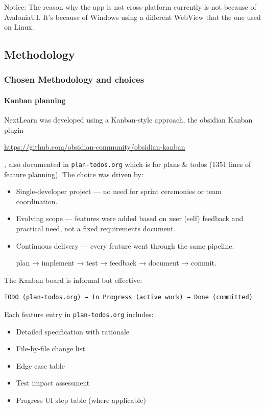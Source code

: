 \documentclass[14pt]{article}
\begin{document}
Notice: The reason why the app is not cross-platform currently is not because of AvaloniaUI. It's because of Windows using a different WebView that the one used on Linux.
\subsection{Methodology}
\label{sec:org0ae90b0}
\subsubsection{Chosen Methodology and choices}
\label{sec:orgc186f3a}
\paragraph{Kanban planning}
\label{sec:org1198668}
NextLearn was developed using a Kanban-style approach, the obsidian Kanban plugin

\url{https://github.com/obsidian-community/obsidian-kanban}

, also documented in
\texttt{plan-todos.org} which is for plans \& todos (1351 lines of feature planning). The choice was driven
by:

\begin{itemize}
\item Single-developer project — no need for sprint ceremonies or
team coordination.
\item Evolving scope — features were added based on user (self) feedback and
practical need, not a fixed requirements document.
\item Continuous delivery — every feature went through the same pipeline:

plan → implement → test → feedback → document → commit.
\end{itemize}

The Kanban board is informal but effective:
\begin{verbatim}
TODO (plan-todos.org) → In Progress (active work) → Done (committed)
\end{verbatim}

Each feature entry in \texttt{plan-todos.org} includes:
\begin{itemize}
\item Detailed specification with rationale
\item File-by-file change list
\item Edge case table
\item Test impact assessment
\item Progress UI step table (where applicable)
\end{itemize}
\end{document}
